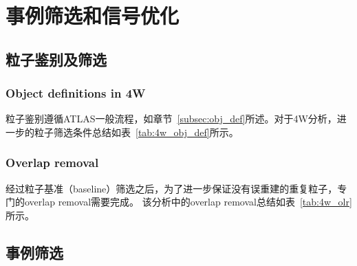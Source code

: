 \chapter{事例筛选和信号优化}\label{chap:evtsel}

\section{粒子鉴别及筛选}

\subsection{Object definitions in 4W}\label{subsec:4w_obj_def}
粒子鉴别遵循ATLAS一般流程，如章节~\ref{subsec:obj_def}所述。对于4W分析，进一步的粒子筛选条件总结如表~\ref{tab:4w_obj_def}所示。


\subsection{Overlap removal}
经过粒子基准（baseline）筛选之后，为了进一步保证没有误重建的重复粒子，专门的overlap removal需要完成。%
该分析中的overlap removal总结如表~\ref{tab:4w_olr}所示。


\section{事例筛选}
